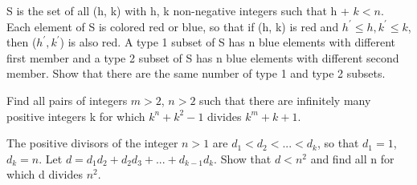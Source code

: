 





\item S is the set of all (h, k) with h, k non-negative integers such that h + $k < n$. Each element of S is colored red or blue, so that if (h, k) is red and $h^{'}\leq h, k^{'} \leq k$, then ($h^{'}, k^{'}$) is also red. A type 1 subset of S has n blue elements with different first member and a type 2 subset of S has n blue elements with different second member. Show that there are the same number of type 1 and type 2 subsets.\\

\item Find all pairs of integers $m > 2$, $n > 2$ such that there are infinitely many positive integers k for which $k^n + k^2 - 1$ divides $k^m + k + 1$.\\

\item The positive divisors of the integer $n > 1$ are $d_1 < d_2 < ... < d_k$, so that $d_1 = 1$, $d_k = n$. Let $d = d_1d_2 + d_2d_3 + ... + d_{k-1}d_k$. Show that $d < n^2$ and find all n for which d divides $n^2$.


